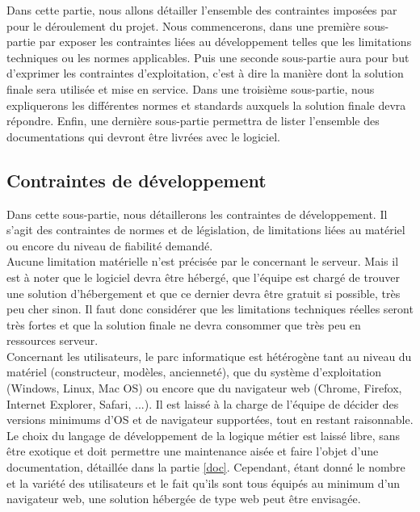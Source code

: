 Dans cette partie, nous allons détailler l'ensemble des contraintes imposées par \nomClient{} pour le déroulement du projet. Nous commencerons, dans une première sous-partie par exposer les contraintes liées au développement telles que les limitations techniques ou les normes applicables. Puis une seconde sous-partie aura pour but d'exprimer les contraintes d'exploitation, c'est à dire la manière dont la solution finale sera utilisée et mise en service. Dans une troisième sous-partie, nous expliquerons les différentes normes et standards auxquels la solution finale devra répondre. Enfin, une dernière sous-partie permettra de lister l'ensemble des documentations qui devront être livrées avec le logiciel.


\subsection{Contraintes de développement}
Dans cette sous-partie, nous détaillerons les contraintes de développement. Il s'agit des contraintes de normes et de législation, de limitations liées au matériel ou encore du niveau de fiabilité demandé.\\


Aucune limitation matérielle n'est précisée par le \client{} concernant le serveur. Mais il est à noter que le logiciel devra être hébergé, que l'équipe \PICCourt{} est chargé de trouver une solution d'hébergement et que ce dernier devra être gratuit si possible, très peu cher sinon. Il faut donc considérer que les limitations techniques réelles seront très fortes et que la solution finale ne devra consommer que très peu en ressources serveur.\\

Concernant les utilisateurs, le parc informatique est hétérogène tant au niveau du matériel (constructeur, modèles, ancienneté), que du système d'exploitation (Windows, Linux, Mac OS) ou encore que du navigateur web (Chrome, Firefox, Internet Explorer, Safari, ...). Il est laissé à la charge de l'équipe \PICCourt{} de décider des versions minimums d'OS et de navigateur supportées, tout en restant raisonnable.\\


Le choix du langage de développement de la logique métier est laissé libre, sans être exotique et doit permettre une maintenance aisée et faire l'objet d'une documentation, détaillée dans la partie \ref{doc}. Cependant, étant donné le nombre et la variété des utilisateurs et le fait qu'ils sont tous équipés au minimum d'un navigateur web, une solution hébergée de type web peut être envisagée.\\

